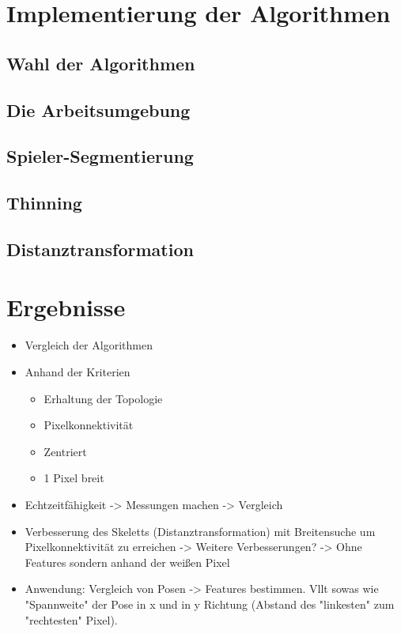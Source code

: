 \documentclass[appendixprefix,a4paper,bibliography=totoc,twoside=true,11pt,DIV=11,BCOR=6mm,headsepline,pointlessnumbers]{scrbook}
\begin{document}
\chapter{Implementierung der Algorithmen}
\section{Wahl der Algorithmen}
\section{Die Arbeitsumgebung}
\section{Spieler-Segmentierung}
\section{Thinning}
\section{Distanztransformation}
\chapter{Ergebnisse}
\begin{itemize}
	\item Vergleich der Algorithmen
	\item Anhand der Kriterien
	\begin{itemize}
		\item Erhaltung der Topologie
		\item Pixelkonnektivität
		\item Zentriert
		\item 1 Pixel breit
	\end{itemize}
	\item Echtzeitfähigkeit -> Messungen machen -> Vergleich
	\item Verbesserung des Skeletts (Distanztransformation) mit Breitensuche um Pixelkonnektivität zu erreichen -> Weitere Verbesserungen? -> Ohne Features sondern anhand der weißen Pixel
	\item Anwendung: Vergleich von Posen -> Features bestimmen. Vllt sowas wie "Spannweite" der Pose in x und in y Richtung (Abstand des "linkesten" zum "rechtesten" Pixel). 
\end{itemize}
\end{document}

